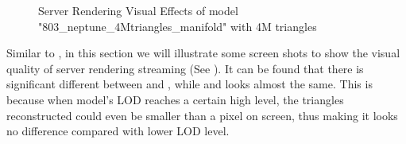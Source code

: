 \begin{figure}
\centering
{}
\hfill
{}
\hfill
{}

\label{fig:neptune_serverrendering_visual_effects}
\caption{Server Rendering Visual Effects of model "803\_neptune\_4Mtriangles\_manifold" with 4M triangles}
\end{figure}

Similar to , in this section we will illustrate some screen shots to show the visual quality of server rendering streaming (See ). It can be found that there is significant different between  and , while  and  looks almost the same. This is because when model's LOD reaches a certain high level, the triangles reconstructed could even be smaller than a pixel on screen, thus making it looks no difference compared with lower LOD level. 

